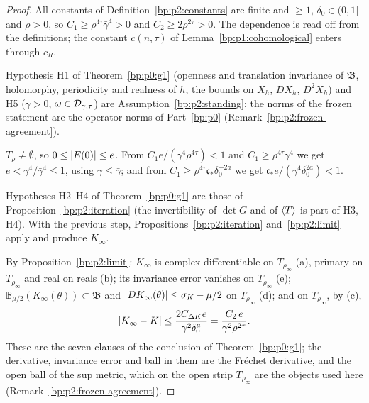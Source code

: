 \begin{proof}
\label{step:p2:g1-constants}
All constants of Definition~\ref{bp:p2:constants} are finite and $\ge1$, $\delta_0\in(0,1]$ and
$\rho>0$, so $C_1\ge\rho^{4\tau}\bar\gamma^4>0$ and $C_2\ge2\rho^{2\tau}>0$. The dependence is read off
from the definitions; the constant $c(n,\tau)$ of Lemma~\ref{bp:p1:cohomological} enters through $c_R$.

\label{step:p2:g1-standing}
Hypothesis H1 of Theorem~\ref{bp:p0:g1} (openness and translation invariance of $\mathfrak B$,
holomorphy, periodicity and realness of $h$, the bounds on $X_h$, $DX_h$, $D^2X_h$) and H5
($\gamma>0$, $\omega\in\mathcal{D}_{\gamma,\tau}$) are Assumption~\ref{bp:p2:standing}; the norms of the frozen
statement are the operator norms of Part~\ref{bp:p0} (Remark~\ref{bp:p2:frozen-agreement}).

\label{step:p2:g1-e}
$T_\rho\ne\emptyset$, so $0\le\lvert E(0)\rvert\le e$. From $C_1e/(\gamma^4\rho^{4\tau})<1$ and $C_1\ge
\rho^{4\tau}\bar\gamma^4$ we get $e<\gamma^4/\bar\gamma^4\le1$, using $\gamma\le\bar\gamma$; and from
$C_1\ge\rho^{4\tau}\mathfrak c_*\delta_0^{-2a}$ we get $\mathfrak c_*e/(\gamma^4\delta_0^{2a})<1$.

\label{step:p2:g1-apply}
Hypotheses H2--H4 of Theorem~\ref{bp:p0:g1} are those of Proposition~\ref{bp:p2:iteration} (the
invertibility of $\det G$ and of $\langle T\rangle$ is part of H3, H4). With the previous step,
Propositions~\ref{bp:p2:iteration} and~\ref{bp:p2:limit} apply and produce $K_\infty$.

\label{step:p2:g1-check}
By Proposition~\ref{bp:p2:limit}: $K_\infty$ is complex differentiable on $T_{\rho_\infty}$ (a), primary on
$T_{\rho_\infty}$ and real on reals (b); its invariance error vanishes on $T_{\rho_\infty}$ (e);
$\mathbb B_{\mu/2}(K_\infty(\theta))\subset\mathfrak B$ and $\lvert DK_\infty(\theta)\rvert\le\sigma_K-\mu/2$ on
$T_{\rho_\infty}$ (d); and on $T_{\rho_\infty}$, by (c),
\[
\lvert K_\infty-K\rvert\le\frac{2C_{\Delta K}e}{\gamma^2\delta_0^a}=\frac{C_2\,e}{\gamma^2\rho^{2\tau}}.
\]
These are the seven clauses of the conclusion of Theorem~\ref{bp:p0:g1}; the derivative, invariance error
and ball in them are the Fr\'echet derivative,  and the open ball of the sup metric,
which on the open strip $T_{\rho_\infty}$ are the objects used here (Remark~\ref{bp:p2:frozen-agreement}).
\end{proof}

